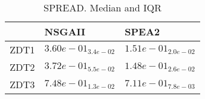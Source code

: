 \documentclass{article}
\begin{document}
\
\begin{table}
\caption{SPREAD. Median and IQR}
\label{table:median.SPREAD}
\begin{scriptsize}
\centering
\begin{tabular}{lll}
\hline & NSGAII &  SPEA2\\
\hline
ZDT1 & \cellcolor{gray25}$  3.60e-01_{ 3.4e-02}$ & \cellcolor{gray95}$  1.51e-01_{ 2.0e-02}$ \\
ZDT2 & \cellcolor{gray25}$  3.72e-01_{ 5.5e-02}$ & \cellcolor{gray95}$  1.48e-01_{ 2.6e-02}$ \\
ZDT3 & \cellcolor{gray25}$  7.48e-01_{ 1.3e-02}$ & \cellcolor{gray95}$  7.11e-01_{ 7.8e-03}$ \\
\hline
\end{tabular}
\end{scriptsize}
\end{table}
\end{document}
